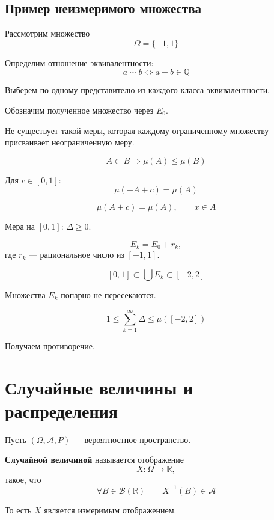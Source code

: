 \documentclass[12pt,a4paper]{article}
\begin{document}
\subsection{Пример неизмеримого множества}

\begin{example}
Рассмотрим множество
\[
\Omega=\{-1,1\}
\]

Определим отношение эквивалентности:
\[
a\sim b\Longleftrightarrow a-b\in\mathbb{Q}
\]

Выберем по одному представителю из каждого класса эквивалентности.

Обозначим полученное множество через $E_0$.

Не существует такой меры, которая каждому ограниченному множеству присваивает неограниченную меру.

\[
A\subset B\Rightarrow \mu(A)\leq\mu(B)
\]

Для $c\in[0,1]$:
\[
\mu(-A+c)=\mu(A)
\]

\[
\mu(A+c)=\mu(A),\qquad x\in A
\]


\begin{note}
Мера на $[0,1]$: $\Delta\geq0$.
\end{note}

\[
E_k=E_0+r_k,
\]
где $r_k$ --- рациональное число из $[-1,1]$.

\[
[0,1]\subset \bigcup E_k\subset[-2,2]
\]

Множества $E_k$ попарно не пересекаются.

\[
1\leq \sum_{k=1}^{\infty}\Delta
\leq \mu([-2,2])
\]

Получаем противоречие.

\end{example}

\newpage

\section{Случайные величины и распределения}

\begin{definition}

Пусть $(\Omega,\mathcal{A},P)$ --- вероятностное пространство.

\textbf{Случайной величиной} называется отображение
\[
X:\Omega\to\mathbb{R},
\]
такое, что
\[
\forall B\in\mathcal{B}(\mathbb{R})
\qquad
X^{-1}(B)\in\mathcal{A}
\]

То есть $X$ является измеримым отображением.

\end{definition}
\end{document}
